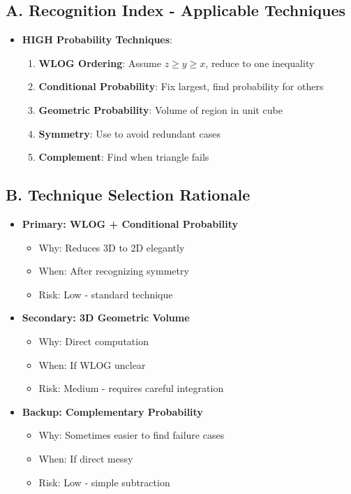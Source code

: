 \documentclass[11pt]{article}
\begin{document}
\begin{conversionbox}
\subsection*{A. Recognition Index - Applicable Techniques}
\begin{itemize}[leftmargin=*]
    \item \textbf{HIGH Probability Techniques}:
    \begin{enumerate}
        \item \textbf{WLOG Ordering}: Assume $z \geq y \geq x$, reduce to one inequality
        \item \textbf{Conditional Probability}: Fix largest, find probability for others
        \item \textbf{Geometric Probability}: Volume of region in unit cube
        \item \textbf{Symmetry}: Use to avoid redundant cases
        \item \textbf{Complement}: Find when triangle fails
    \end{enumerate}
\end{itemize}

\subsection*{B. Technique Selection Rationale}
\begin{itemize}[leftmargin=*]
    \item \textbf{Primary: WLOG + Conditional Probability}
    \begin{itemize}
        \item Why: Reduces 3D to 2D elegantly
        \item When: After recognizing symmetry
        \item Risk: Low - standard technique
    \end{itemize}
    
    \item \textbf{Secondary: 3D Geometric Volume}
    \begin{itemize}
        \item Why: Direct computation
        \item When: If WLOG unclear
        \item Risk: Medium - requires careful integration
    \end{itemize}
    
    \item \textbf{Backup: Complementary Probability}
    \begin{itemize}
        \item Why: Sometimes easier to find failure cases
        \item When: If direct messy
        \item Risk: Low - simple subtraction
    \end{itemize}
\end{itemize}


\end{conversionbox}
\end{document}

